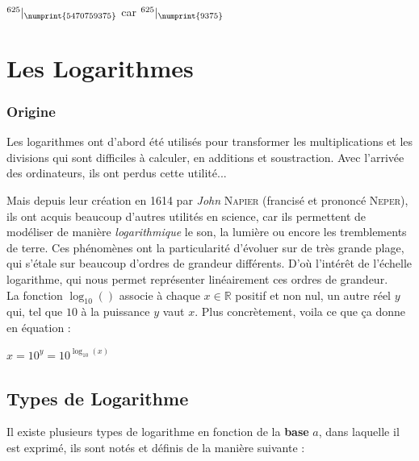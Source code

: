 \documentclass[a4paper]{article}
\begin{document}
{\Large $^{625}|_{\numprint{5470759375}}$} car {\Large $^{625}|_{\numprint{9375}}$ }


\vfill

\pagebreak


















\section{Les Logarithmes} \label{intro_log}
\subsubsection*{Origine}

	Les logarithmes ont d'abord été utilisés pour transformer les multiplications et les divisions qui sont difficiles à calculer, en additions et soustraction. Avec l'arrivée des ordinateurs, ils ont perdus cette utilité...
	
	Mais depuis leur création en 1614 par \textit{John} {\scshape Napier} (francisé et prononcé {\scshape Neper}), ils ont acquis beaucoup d'autres utilités en science, car ils permettent de modéliser de manière \textit{logarithmique} le son, la lumière ou encore les tremblements de terre. Ces phénomènes ont la particularité d'évoluer sur de très grande plage, qui s'étale sur beaucoup d'ordres de grandeur différents. D'où l'intérêt de l'échelle logarithme, qui nous permet représenter linéairement ces ordres de grandeur. \\
	
	La fonction $\log_{10}()$ associe à chaque $x \in \mathbb{R}$ positif et non nul, un autre réel $y$ qui, tel que $10$ à la puissance $y$ vaut $x$.
	Plus concrètement, voila ce que ça donne en équation :

\begin{center}
	\huge
	$ x = 10^y = 10^{\log_{10}(x)}$
\end{center}

\subsection*{Types de Logarithme}

Il existe plusieurs types de logarithme en fonction de la \textbf{base} $a$, dans laquelle il est exprimé, ils sont notés et définis de la manière suivante :
	
\end{document}
